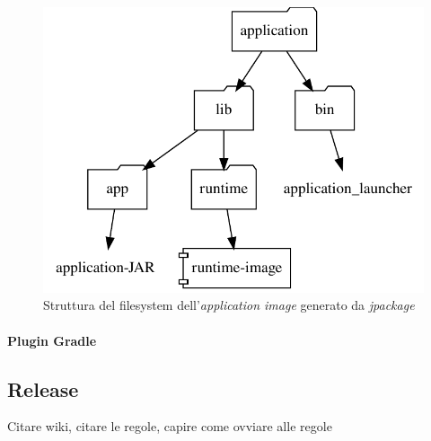\begin{figure}[H]
	\centering
	\includegraphics[width=.7\linewidth]{figures/application-image-folder-structure.pdf}
	\caption{Struttura del filesystem dell'\textit{application image} generato da \textit{jpackage}}
	\label{fig:activity-diagram-job}
\end{figure}

\paragraph{Plugin Gradle}


\subsection{Release}
Citare wiki, citare le regole, capire come ovviare alle regole